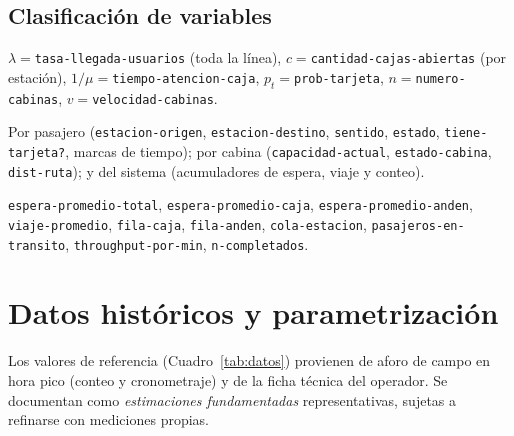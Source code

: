 \documentclass[11pt,a4paper]{article}
\newcommand{\code}[1]{\texttt{#1}}
\begin{document}
\subsection{Clasificación de variables}
\begin{description}[style=unboxed,leftmargin=1.2em]
  \item[Variables de entrada (parámetros / \emph{sliders}).]
  $\lambda=$\code{tasa-llegada-usuarios} (toda la línea),
  $c=$\code{cantidad-cajas-abiertas} (por estación),
  $1/\mu=$\code{tiempo-atencion-caja},
  $p_t=$\code{prob-tarjeta},
  $n=$\code{numero-cabinas},
  $v=$\code{velocidad-cabinas}.
  \item[Variables de estado.] Por pasajero (\code{estacion-origen},
  \code{estacion-destino}, \code{sentido}, \code{estado}, \code{tiene-tarjeta?},
  marcas de tiempo); por cabina (\code{capacidad-actual}, \code{estado-cabina},
  \code{dist-ruta}); y del sistema (acumuladores de espera, viaje y conteo).
  \item[Variables de salida (\emph{reporters}).]
  \code{espera-promedio-total}, \code{espera-promedio-caja},
  \code{espera-promedio-anden}, \code{viaje-promedio},
  \code{fila-caja}, \code{fila-anden}, \code{cola-estacion},
  \code{pasajeros-en-transito}, \code{throughput-por-min}, \code{n-completados}.
\end{description}

\section{Datos históricos y parametrización}

Los valores de referencia (Cuadro~\ref{tab:datos}) provienen de aforo de campo en
hora pico (conteo y cronometraje) y de la ficha técnica del operador. Se documentan
como \emph{estimaciones fundamentadas} representativas, sujetas a refinarse con
mediciones propias.
\end{document}
